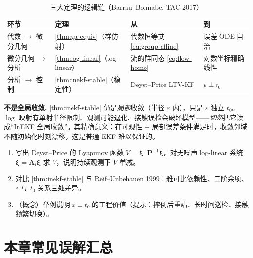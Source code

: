 \begin{table}[H]\centering\small
\caption{三大定理的逻辑链（Barrau--Bonnabel TAC 2017）}
\label{tab:three-theorems}
\begin{tabular}{llll}
\toprule
环节 & 定理 & 从 & 到 \\
\midrule
代数 $\to$ 微分几何 & \cref{thm:ga-equiv}（群仿射） & 代数恒等式 \cref{eq:group-affine} & 误差 ODE 自治 \\
微分几何 $\to$ 分析 & \cref{thm:log-linear}（log-linear） & 流的群同态 \cref{eq:flow-homo} & 对数坐标精确线性 \\
分析 $\to$ 控制 & \cref{thm:inekf-stable}（稳定性） & Deyst--Price LTV-KF & $\varepsilon\perp t_0$ \\
\bottomrule
\end{tabular}
\end{table}

\begin{note}
\textbf{不是全局收敛.}\;
\cref{thm:inekf-stable} 仍是\emph{局部}收敛（半径 $\varepsilon$ 内），只是 $\varepsilon$ 独立 $t_0$。$\log$ 映射有单射半径限制、观测可能退化、接触误检会破坏模型——\emph{切勿}把它读成“InEKF 全局收敛”。其精确意义：在可观性 $+$ 局部误差条件满足时，收敛邻域不随初始化时刻漂移，这是普通 EKF 难以保证的。
\end{note}

\begin{practice}
\begin{enumerate}
  \item 写出 Deyst--Price 的 Lyapunov 函数 $V=\boldsymbol{\xi}^\top\mathbf{P}^{-1}\boldsymbol{\xi}$，对无噪声 log-linear 系统 $\dot{\boldsymbol{\xi}}=\mathbf{A}_t\boldsymbol{\xi}$ 求 $\dot V$，说明持续观测下 $V$ 单减。
  \item 对比 \cref{thm:inekf-stable} 与 Reif--Unbehauen 1999：雅可比依赖性、二阶余项、$\varepsilon$ 与 $t_0$ 关系三处差异。
  \item （概念）举例说明 $\varepsilon\perp t_0$ 的工程价值（提示：摔倒后重站、长时间巡检、接触频繁切换）。
\end{enumerate}
\end{practice}

\section*{本章常见误解汇总}

